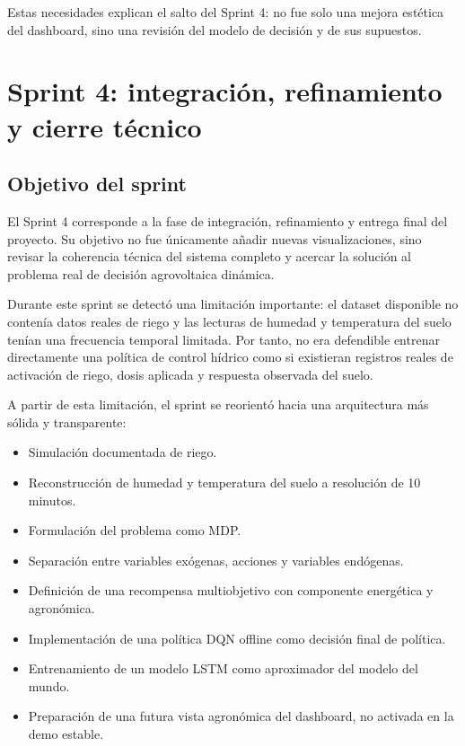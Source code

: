 ﻿\documentclass[11pt,a4paper]{article}
\begin{document}
Estas necesidades explican el salto del Sprint 4: no fue solo una mejora estética del dashboard, sino una revisión del modelo de decisión y de sus supuestos.

\newpage

\section{Sprint 4: integración, refinamiento y cierre técnico}

\subsection{Objetivo del sprint}

El Sprint 4 corresponde a la fase de integración, refinamiento y entrega final del proyecto. Su objetivo no fue únicamente añadir nuevas visualizaciones, sino revisar la coherencia técnica del sistema completo y acercar la solución al problema real de decisión agrovoltaica dinámica.

Durante este sprint se detectó una limitación importante: el dataset disponible no contenía datos reales de riego y las lecturas de humedad y temperatura del suelo tenían una frecuencia temporal limitada. Por tanto, no era defendible entrenar directamente una política de control hídrico como si existieran registros reales de activación de riego, dosis aplicada y respuesta observada del suelo.

A partir de esta limitación, el sprint se reorientó hacia una arquitectura más sólida y transparente:

\begin{itemize}
    \item Simulación documentada de riego.
    \item Reconstrucción de humedad y temperatura del suelo a resolución de 10 minutos.
    \item Formulación del problema como MDP.
    \item Separación entre variables exógenas, acciones y variables endógenas.
    \item Definición de una recompensa multiobjetivo con componente energética y agronómica.
    \item Implementación de una política DQN offline como decisión final de política.
    \item Entrenamiento de un modelo LSTM como aproximador del modelo del mundo.
    \item Preparación de una futura vista agronómica del dashboard, no activada en la demo estable.
\end{itemize}
\end{document}
